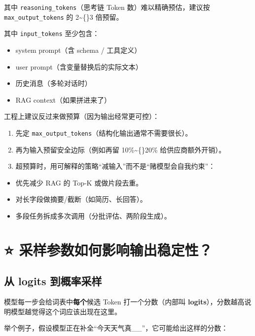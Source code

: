 \documentclass[9pt,a4paper,twocolumn]{ctexart}
\begin{document}
其中 \texttt{reasoning\_tokens}（思考链 Token 数）难以精确预估，建议按 \texttt{max\_output\_tokens} 的 2\textasciitilde\{\}3 倍预留。



其中 \texttt{input\_tokens} 至少包含：


\begin{itemize}[itemsep=1pt, topsep=2pt]
  \item system prompt（含 schema / 工具定义）
  \item user prompt（含变量替换后的实际文本）
  \item 历史消息（多轮对话时）
  \item RAG context（如果拼进来了）
\end{itemize}


工程上建议反过来做预算（因为输出经常更可控）：


\begin{enumerate}[itemsep=1pt, topsep=2pt]
  \item 先定 \texttt{max\_output\_tokens}（结构化输出通常不需要很长）。
  \item 再为输入预留安全边际（例如再留 10\%\textasciitilde\{\}20\% 给供应商额外开销）。
  \item 超预算时，用可解释的策略“减输入”而不是“赌模型会自我约束”：
\end{enumerate}
\begin{itemize}[itemsep=1pt, topsep=2pt]
  \item 优先减少 RAG 的 Top-K 或做片段去重。
  \item 对长字段做摘要/截断（如简历、长回答）。
  \item 多段任务拆成多次调用（分批评估、两阶段生成）。
\end{itemize}


\section*{⭐️ 采样参数如何影响输出稳定性？}


\subsection*{从 logits 到概率采样}


模型每一步会给词表中\textbf{每个}候选 Token 打一个分数（内部叫 \textbf{logits}），分数越高说明模型越觉得这个词应该出现在这里。



举个例子，假设模型正在补全“今天天气真\_\_”，它可能给出这样的分数：
\end{document}
